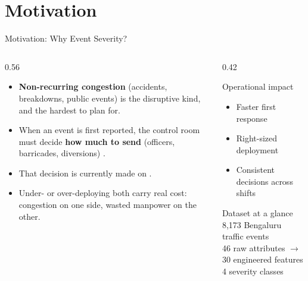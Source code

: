 \section{Motivation}

\begin{frame}{Motivation: Why Event Severity?}
  \begin{columns}[T]
    \begin{column}{0.56\textwidth}
      \begin{itemize}
        \item \textbf{Non-recurring congestion} (accidents, breakdowns, public
              events) is the disruptive kind, and the hardest to plan for.
        \item When an event is first reported, the control room must decide
              \textbf{how much to send} (officers, barricades, diversions)
              .
        \item That decision is currently made on .
        \item Under- or over-deploying both carry real cost: congestion on one
              side, wasted manpower on the other.
      \end{itemize}
    \end{column}
    \begin{column}{0.42\textwidth}
      \begin{block}{Operational impact}
        \begin{itemize}
          \item[\color{astramGreen}$\checkmark$] Faster first response
          \item[\color{astramGreen}$\checkmark$] Right-sized deployment
          \item[\color{astramGreen}$\checkmark$] Consistent decisions across shifts
        \end{itemize}
      \end{block}
      \begin{exampleblock}{Dataset at a glance}
        \small
        8{,}173 Bengaluru traffic events\\
        46 raw attributes $\rightarrow$ 30 engineered features\\
        4 severity classes
      \end{exampleblock}
    \end{column}
  \end{columns}
\end{frame}

